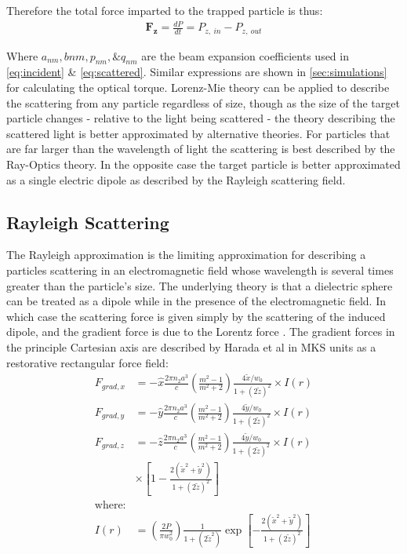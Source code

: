 Therefore the total force imparted to the trapped particle is thus:
\begin{align}
	\boldsymbol{F_z} =\frac{dP}{dt} = P_{z,\ in} -P_{z,\ out}
\end{align}

Where $a_{nm}, b{nm}, p_{nm}, \& q_{nm}$ are the beam expansion 
coefficients used in \eqref{eq:incident} \& \eqref{eq:scattered}.
Similar expressions are shown in \ref{sec:simulations} for 
calculating the optical torque. Lorenz-Mie theory can be applied 
to describe the scattering from any particle regardless of size, 
though as the size of the target particle changes - relative to 
the light being scattered - the theory describing the scattered 
light is better approximated by alternative theories. For 
particles that are far larger than the wavelength of light the 
scattering is best described by the Ray-Optics theory. In the 
opposite case the target particle is better approximated as a 
single electric dipole as described by the Rayleigh scattering 
field.  

\subsection{Rayleigh Scattering}

The Rayleigh approximation is the limiting approximation for 
describing a particles scattering in an electromagnetic field 
whose wavelength is several times greater than the particle's 
size. The underlying theory is that a dielectric sphere can be 
treated as a dipole while in the presence of the electromagnetic 
field. In which case the scattering force is given simply by the 
scattering of the induced dipole, and the gradient force is due 
to the Lorentz force \cite{Gordon1973}. The gradient forces in the 
principle Cartesian axis are described by Harada et al 
\cite{YasuhiroHarada1996} in MKS units as a restorative rectangular 
force field:
\begin{align}
  F_{grad,x}
  &=-\hat{x} \frac{2\pi n_2 a^3}{c}
    \left(\frac{m^2-1}{m^2+2}\right) \frac{4\tilde{x}/w_0}{1+(2\tilde{z})^2} \times I(r)
  \\
  F_{grad,y}
  &=-\hat{y} \frac{2\pi n_2 a^3}{c}
    \left(\frac{m^2-1}{m^2+2}\right) \frac{4\tilde{y}/w_0}{1+(2\tilde{z})^2} \times I(r)
  \\
  F_{grad,z}
  &=-\hat{z} \frac{2\pi n_2 a^3}{c}
    \left(\frac{m^2-1}{m^2+2}\right) \frac{4\tilde{y}/w_0}{1+(2\tilde{z})^2}
    \nonumber \times I(r)
  \\ 
  & \times \left[1-\frac{2(\tilde{x}^2+\tilde{y}^2)}{1+(2\tilde{z})^2} \right]
  \\
  \text{where:}
  \nonumber
  \\
	I(r) &= \left(\frac{2P}{\pi w_0^2}\right) \frac{1}{1+(2\tilde{z}^2)} 
	\exp \left[ - \frac{2(\tilde{x}^2+\tilde{y}^2)}{1+(2\tilde{z})^2} \right]
\end{align}

